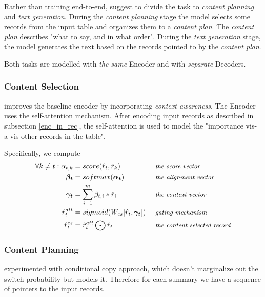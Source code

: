Rather than training end-to-end, \citep{puduppully2019datatotext} suggest to divide the task to \emph{content planning} and \emph{text generation}. During the \emph{content planning} stage the model selects some records from the input table and organizes them to a \emph{content plan}. The \emph{content plan} describes "what to say, and in what order". During the \emph{text generation} stage, the model generates the text based on the records pointed to by the \emph{content plan}.

Both tasks are modelled with \emph{the same} Encoder and with \emph{separate} Decoders.

\subsubsection{Content Selection}

\citep{puduppully2019datatotext} improves the baseline encoder by incorporating \emph{context awareness}. The Encoder uses the self-attention mechanism. After encoding input records as described in subsection \ref{enc_in_rec}, the self-attention is used to model the "importance vis-a-vis other records in the table".

Specifically, we compute
\begin{align*}
\forall k \neq t : \alpha_{t, k} &= score(\hat{r}_t, \hat{r}_k)                         &&\mbox{ \small \emph{the score vector}}\\
\boldsymbol{\beta_t}             &= softmax(\boldsymbol{\alpha_t})                      &&\mbox{ \small \emph{the alignment vector}}\\
\boldsymbol{\gamma_t}            &= \sum_{i=1}^m{\beta_{t, i} * \hat{r}_i}               &&\mbox{ \small \emph{the context vector}}\\
\hat{r}_t^{att}                  &= sigmoid( W_{cs} [\hat{r}_t, \boldsymbol{\gamma_t}] ) &&\mbox{ \small \emph{gating mechanism}}\\
\hat{r}_t^{cs}                   &= \hat{r}_t^{att} \bigodot \hat{r}_t                  &&\mbox{ \small \emph{the content selected record}}
\end{align*}

\subsubsection{Content Planning}

\citep{wiseman2017} experimented with conditional copy approach, which doesn't marginalize out the switch probability but models it. Therefore for each summary we have a sequence of pointers to the input records. 


